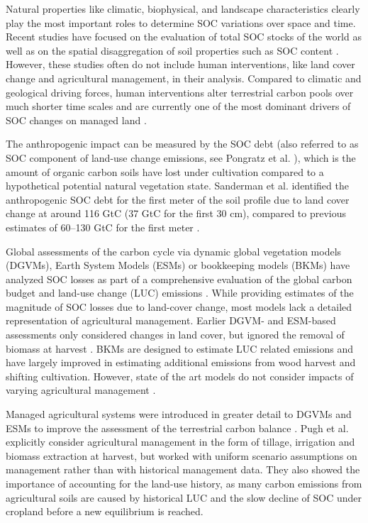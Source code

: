 \documentclass[gc, manuscript]{copernicus}
\begin{document}
Natural properties like climatic, biophysical, and landscape characteristics clearly play the most important roles to determine SOC variations over space and time. Recent studies have focused on the evaluation of total SOC stocks of the world as well as on the spatial disaggregation of soil properties such as SOC content \citep{batjes_harmonized_2016, hengl_soilgrids250m_2017, fao_global_2018}. However, these studies often do not include human interventions, like land cover change and agricultural management, in their analysis. Compared to climatic and geological driving forces, human interventions alter terrestrial carbon pools over much shorter time scales and are currently one of the most dominant drivers of SOC changes on managed land \citep{hansis_relevance_2015, bastos_comparison_2021}.

The anthropogenic impact can be measured by the SOC debt (also referred to as SOC component of land-use change emissions, see Pongratz et al. \citeyearpar{pongratz_terminolgy_2014}), which is the amount of organic carbon soils have lost under cultivation compared to a hypothetical potential natural vegetation state. Sanderman et al. \citeyearpar{sanderman_soil_2017} identified the anthropogenic SOC debt for the first meter of the soil profile due to land cover change at around 116 GtC (37 GtC for the first 30 cm), compared to previous estimates of 60--130 GtC for the first meter \citep{lal_world_2001}.

Global assessments of the carbon cycle via dynamic global vegetation models (DGVMs), Earth System Models (ESMs) or bookkeeping models (BKMs) have analyzed SOC losses as part of a comprehensive evaluation of the global carbon budget and land-use change (LUC) emissions \citep{frielingstein_glob_carbon_2020}. While providing estimates of the magnitude of SOC losses due to land-cover change, most models lack a detailed representation of agricultural management. Earlier DGVM- and ESM-based assessments only considered changes in land cover, but ignored the removal of biomass at harvest \citep{strassmann_simulating_2008, betts_climate_2015}. BKMs are designed to estimate LUC related emissions and have largely improved in estimating additional emissions from wood harvest and shifting cultivation. However, state of the art models do not consider impacts of varying agricultural management \citep{frielingstein_glob_carbon_2020, houghton_carbon_2012, hansis_relevance_2015, bastos_comparison_2021}.

Managed agricultural systems were introduced in greater detail to DGVMs and ESMs to improve the assessment of the terrestrial carbon balance \citep[e.g.][]{bondeau_modelling_2007, lindeskog_implications_2013}. Pugh et al. \citeyearpar{pugh_simulated_2015} explicitly consider agricultural management in the form of tillage, irrigation and biomass extraction at harvest, but worked with uniform scenario assumptions on management rather than with historical management data. They also showed the importance of accounting for the land-use history, as many carbon emissions from agricultural soils are caused by historical LUC and the slow decline of SOC under cropland before a new equilibrium is reached.
\end{document}
